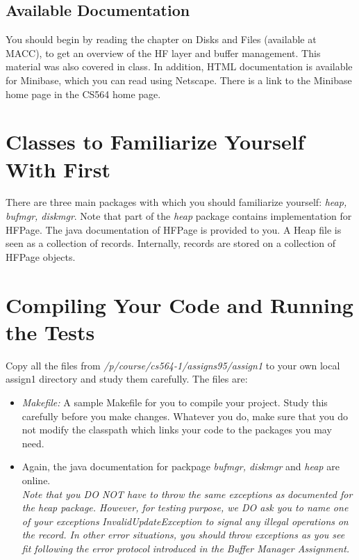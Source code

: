 \subsection{Available Documentation}

You should begin by reading the chapter  on Disks and Files (available
at MACC),  to get an overview of  the HF layer and buffer management.
This  material  was   also  covered in class.    In addition,  HTML
documentation   is available for  Minibase,  which  you can read using
Netscape.  There is a link to the Minibase home page in the CS564 home
page.

\section{Classes to Familiarize Yourself With First}

There are three main packages with which you should
familiarize yourself: {\em heap, bufmgr, diskmgr}.  Note that
part of the {\em heap} package contains implementation for
HFPage.  The java documentation of HFPage is provided to you.
A Heap file is seen as a collection of records.  Internally,
records are stored on a collection of HFPage objects.

\section{Compiling Your Code and Running the Tests}

Copy all the files  from {\em /p/course/cs564-1/assigns95/assign1} to
your own local assign1 directory  and study them carefully.  The files
are:

\begin {itemize}
\item
{\em Makefile:}  A sample Makefile  for  you to compile  your project.
Study this carefully before you make changes.  Whatever you do, make
sure that you do not modify the classpath which links your code to
the packages you may need.

\item
Again, the java documentation for packpage {\em bufmgr, diskmgr} and
{\em heap} are online. \\
{\em Note that you DO NOT have to throw the same exceptions as}
{\em documented for the heap package.  However, for testing}
{\em purpose, we DO ask you to name one of your exceptions}
{\em InvalidUpdateException to signal any illegal operations}
{\em on the record.  In other error situations, you should} 
{\em throw exceptions as you see fit following the error protocol}
{\em introduced in the Buffer Manager Assignment.}

\end{itemize}

